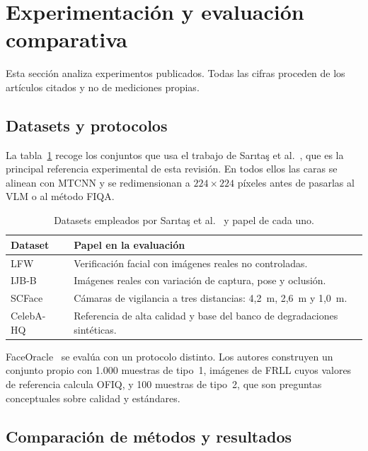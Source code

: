 \section{Experimentación y evaluación comparativa}
\label{sec:evaluacion}
Esta sección analiza experimentos publicados. Todas las cifras proceden de los artículos citados y no de mediciones propias.

\subsection{Datasets y protocolos}
La tabla~\ref{tab:datasets} recoge los conjuntos que usa el trabajo de Sarıtaş et al.~\cite{Saritas_2026_FG}, que es la principal referencia experimental de esta revisión. En todos ellos las caras se alinean con MTCNN y se redimensionan a $224\times224$ píxeles antes de pasarlas al VLM o al método FIQA.
\begin{table}[htbp]
\centering\small
\caption{Datasets empleados por Sarıtaş et al.~\cite{Saritas_2026_FG} y papel de cada uno.}
\label{tab:datasets}
\begin{tabularx}{\linewidth}{@{}lX@{}}
\toprule
Dataset & Papel en la evaluación \\
\midrule
LFW~\cite{Huang_2008_ECCVW} & Verificación facial con imágenes reales no controladas. \\
IJB-B~\cite{Whitelam_2017_CVPRW} & Imágenes reales con variación de captura, pose y oclusión. \\
SCFace~\cite{Grgic_2011_MTAP} & Cámaras de vigilancia a tres distancias: 4,2~m, 2,6~m y 1,0~m. \\
CelebA-HQ~\cite{Karras_2018_ICLR} & Referencia de alta calidad y base del banco de degradaciones sintéticas. \\
\bottomrule
\end{tabularx}
\end{table}
FaceOracle~\cite{Kabbani_2024_ECCVW} se evalúa con un protocolo distinto. Los autores construyen un conjunto propio con 1.000 muestras de tipo~1, imágenes de FRLL cuyos valores de referencia calcula OFIQ, y 100 muestras de tipo~2, que son preguntas conceptuales sobre calidad y estándares.

\subsection{Comparación de métodos y resultados}
